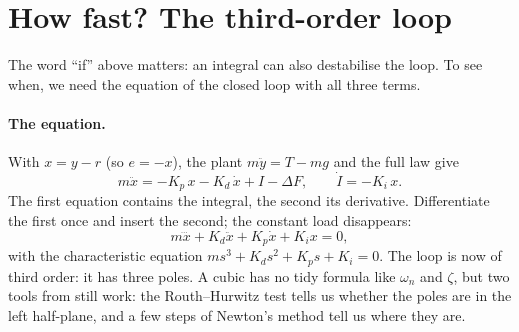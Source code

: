 \section{How fast? The third-order loop}

The word \enquote{if} above matters: an integral can also destabilise the loop. To see when, we need the equation of the closed loop with all three terms.

\paragraph{The equation.} With $x = y - r$ (so $e = -x$), the plant $m\ddot y = T - mg$ and the full law give
\begin{equation}\label{eq:integral-loop}
  m\ddot x = -K_p\,x - K_d\,\dot x + I - \Delta F, \qquad \dot I = -K_i\,x .
\end{equation}
The first equation contains the integral, the second its derivative. Differentiate the first once and insert the second; the constant load disappears:
\begin{equation}\label{eq:integral-cubic}
  m\dddot x + K_d\ddot x + K_p\dot x + K_i x = 0 ,
\end{equation}
with the characteristic equation $m s^3 + K_d s^2 + K_p s + K_i = 0$.
The loop is now of third order: it has three poles. A cubic has no tidy formula like $\omega_n$ and $\zeta$, but two tools from  still work: the Routh–Hurwitz test tells us whether the poles are in the left half-plane, and a few steps of Newton's method tell us where they are.

